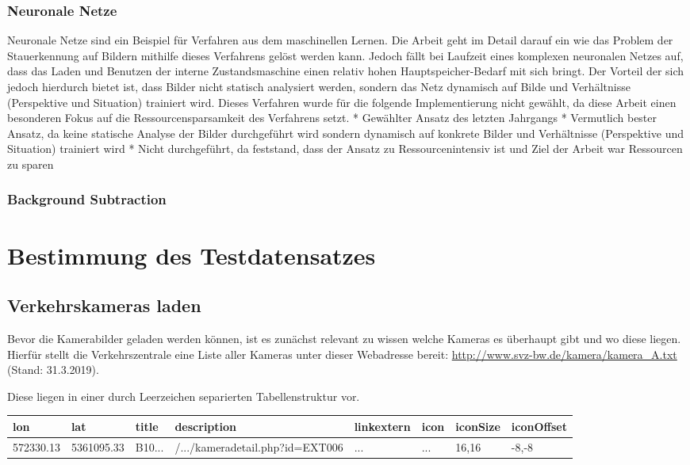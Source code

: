 \subsubsection{Neuronale Netze}
Neuronale Netze sind ein Beispiel für Verfahren aus dem maschinellen Lernen. 
Die Arbeit \cite{hkkDhbw} geht im Detail darauf ein wie das Problem der Stauerkennung auf Bildern mithilfe dieses Verfahrens gelöst werden kann. 
Jedoch fällt bei Laufzeit eines komplexen neuronalen Netzes auf, dass das Laden und Benutzen der interne Zustandsmaschine einen relativ hohen Hauptspeicher-Bedarf mit sich bringt.
Der Vorteil der sich jedoch hierdurch bietet ist, dass Bilder nicht statisch analysiert werden, sondern das Netz dynamisch auf Bilde und Verhältnisse (Perspektive und Situation) trainiert wird.
Dieses Verfahren wurde für die folgende Implementierung nicht gewählt, da diese Arbeit einen besonderen Fokus auf die Ressourcensparsamkeit des Verfahrens setzt.
* Gewählter Ansatz des letzten Jahrgangs\newline
* Vermutlich bester Ansatz, da keine statische Analyse der Bilder durchgeführt wird\newline
	sondern dynamisch auf konkrete Bilder und Verhältnisse (Perspektive und Situation) trainiert wird
* Nicht durchgeführt, da feststand, dass der Ansatz zu Ressourcenintensiv ist und Ziel der Arbeit war Ressourcen zu sparen\newline

\subsubsection{Background Subtraction}

\section{Bestimmung des Testdatensatzes}
\subsection{Verkehrskameras laden}
Bevor die Kamerabilder geladen werden können, ist es zunächst relevant zu wissen welche Kameras es überhaupt gibt und wo diese liegen.
Hierfür stellt die Verkehrszentrale eine Liste aller Kameras unter dieser Webadresse bereit: \url{http://www.svz-bw.de/kamera/kamera_A.txt} (Stand: 31.3.2019).

Diese liegen in einer durch Leerzeichen separierten Tabellenstruktur vor.

\begin{center}
\small\addtolength{\tabcolsep}{-5pt}
    \begin{tabular}{ | l | l | l | l | l | l | l | l |}
    \hline
		lon & lat & title & description & linkextern & icon & iconSize & iconOffset \\ \hline
    572330.13 &
		5361095.33 &
		B10... &
		/.../kameradetail.php?id=EXT006 &
		... &
		... &
		16,16 &
		-8,-8 \\
    \hline
    \end{tabular}
\end{center}

